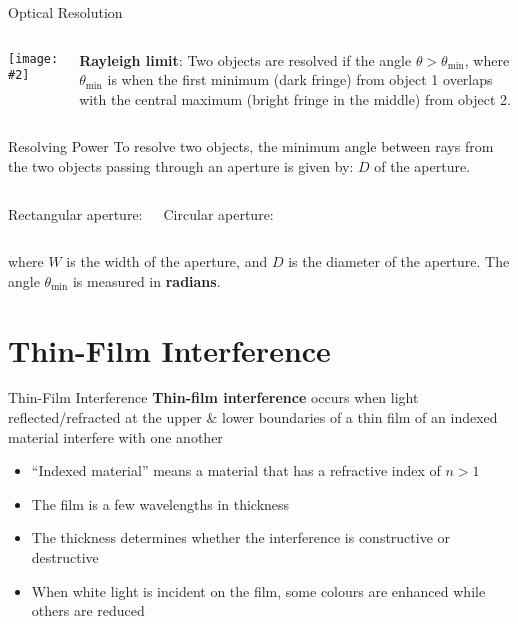 \documentclass[12pt,compress,aspectratio=169]{beamer}
\newcommand{\pic}[2]{\texttt{[image: \#2]}}
\newcommand{\eq}[2]{\vspace{#1}{\LARGE\begin{displaymath}#2\end{displaymath}}}
\begin{document}
\begin{frame}{Optical Resolution}
  \begin{columns}
    \pic{1}{graphics/resolve4}

    \textbf{Rayleigh limit}: Two objects are resolved if the angle
      $\theta>\theta_\text{min}$, where $\theta_\text{min}$ is when the first
      minimum (dark fringe) from object 1 overlaps with the central maximum
      (bright fringe in the middle) from object 2.
  \end{columns}
\end{frame}


\begin{frame}{Resolving Power}
  To resolve two objects, the minimum angle between rays from the two objects
  passing through an aperture is given by:
  $D$ of the aperture.
  \vspace{0.2in}
  \begin{columns}
    Rectangular aperture:

    \eq{-.2in}{
      \boxed{\theta_\text{min}=\frac{\lambda}W}
    }
    Circular aperture:

    \eq{-.2in}{
      \boxed{\theta_\text{min}=\frac{1.22\lambda}D}
    }
  \end{columns}
  where $W$ is the width of the aperture, and $D$ is the diameter of the
  aperture. The angle $\theta_\text{min}$ is measured in \textbf{radians}.
\end{frame}


\section{Thin-Film Interference}

\begin{frame}{Thin-Film Interference}
  \textbf{Thin-film interference} occurs when light reflected/refracted at
  the upper \& lower boundaries of a thin film of an indexed material interfere
  with one another
  \begin{itemize}
  \item ``Indexed material'' means a material that has a refractive index of
    $n>1$
  \item The film is a few wavelengths in thickness
  \item The thickness determines whether the interference is constructive or
    destructive
  \item When white light is incident on the film, some colours are enhanced
    while others are reduced
  \end{itemize}
\end{frame}
\end{document}
